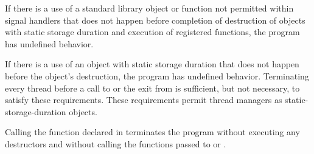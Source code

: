 \pnum
If there is a use of a standard library object or function not permitted within signal
handlers that does not happen before
completion of destruction of objects with static storage duration and execution of
 registered functions, the program has
undefined behavior.
\begin{note}
If there is a use of an object with static storage
duration that does not happen before the object's destruction, the program has undefined
behavior. Terminating every thread before a call to  or the exit from
 is sufficient, but not necessary, to satisfy these requirements. These
requirements permit thread managers as static-storage-duration objects.
\end{note}

\pnum
{}%
%
%
Calling the function  declared in
 terminates the program without executing any destructors
and without calling
the functions passed to  or .%
